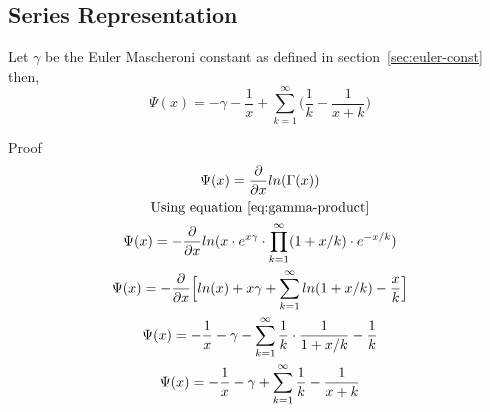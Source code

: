 \documentclass[a4paper]{article}
\begin{document}
    \subsection{Series Representation}\label{subsec:series-representation}

    \begin{theorem}
        Let $\gamma$ be the Euler Mascheroni constant as defined in section~\ref{sec:euler-const} then,
        \begin{equation}
            \label{eq:psi-series}
            \boxed{
                \Psi(x) = -\gamma - \frac{1}{x} + \sum_{k=1}^{\infty} \Big( \frac{1}{k} - \frac{1}{x+k}  \Big)
            }
        \end{equation}

        Proof
        \\
        \begin{gather*}
            \Psi(x) = \frac{\partial}{\partial x}  ln(\Gamma(x))
            \\
            \text{Using equation~\ref{eq:gamma-product}}
            \\
            \Psi(x) = -\frac{\partial}{\partial x} ln(x \cdot e^{x \gamma} \cdot \prod_{k=1}^{\infty} (1 + x/k) \cdot e^{-x/k})
            \\
            \Psi(x) = -\frac{\partial}{\partial x} \Big[ ln(x) + x \gamma + \sum_{k=1}^{\infty} ln(1 + x/k) - \frac{x}{k}
            \Big]
            \\
            \Psi(x) = -\frac{1}{x}  -  \gamma - \sum_{k=1}^{\infty} \frac{1}{k} \cdot \frac{1}{1 + x/k} - \frac{1}{k}
            \\
            \Psi(x) = -\frac{1}{x}  -  \gamma + \sum_{k=1}^{\infty} \frac{1}{k} - \frac{1}{x + k}
        \end{gather*}
    \end{theorem}
\end{document}
